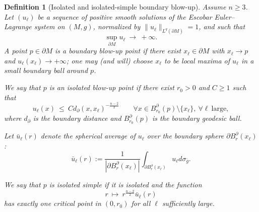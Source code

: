 \documentclass[11pt,reqno,a4paper]{amsart}
\numberwithin{equation}{section}
\theoremstyle{plain}
\newtheorem{definition}[theorem]{Definition}
\theoremstyle{remark}
\theoremstyle{plain}
\begin{document}
\begin{definition}[Isolated and isolated-simple boundary blow-up]\label{def:isolated-simple}
Assume $n\ge3$. Let $(u_\ell)$ be a sequence of positive smooth solutions of the Escobar Euler--Lagrange system
on $(M,g)$, normalized by $\|u_\ell\|_{L^q(\partial M)}=1$, and such that
\[
\sup_{\partial M}u_\ell\ \longrightarrow\ +\infty.
\]
A point $p\in\partial M$ is a \emph{boundary blow-up point} if there exist $x_\ell\in\partial M$ with
$x_\ell\to p$ and $u_\ell(x_\ell)\to+\infty$; one may (and will) choose $x_\ell$ to be local maxima of $u_\ell$
in a small boundary ball around $p$.

We say that $p$ is an \emph{isolated} blow-up point if there exist $r_0>0$ and $C\ge1$ such that
\[
u_\ell(x)\ \le\ Cd_\partial(x,x_\ell)^{-\frac{n-2}{2}}
\qquad\forall x\in B^{\partial}_{r_0}(p)\setminus\{x_\ell\},\ \forall\ell\ \text{large},
\]
where $d_\partial$ is the boundary distance and $B^\partial_{r_0}(p)$ is the boundary geodesic ball.

Let $\bar u_\ell(r)$ denote the spherical average of $u_\ell$ over the boundary sphere $\partial B^\partial_r(x_\ell)$:
\[
\bar u_\ell(r):=\frac{1}{|\partial B^\partial_r(x_\ell)|}\int_{\partial B^\partial_r(x_\ell)}u_\ell d\sigma_{\bar g}.
\]

We say that $p$ is \emph{isolated simple} if it is isolated and the function
\[
r\ \longmapsto\ r^{\frac{n-2}{2}}\bar u_\ell(r)
\]
has exactly one critical point in $(0,r_0)$ for all $\ell$ sufficiently large.
\end{definition}
\end{document}
